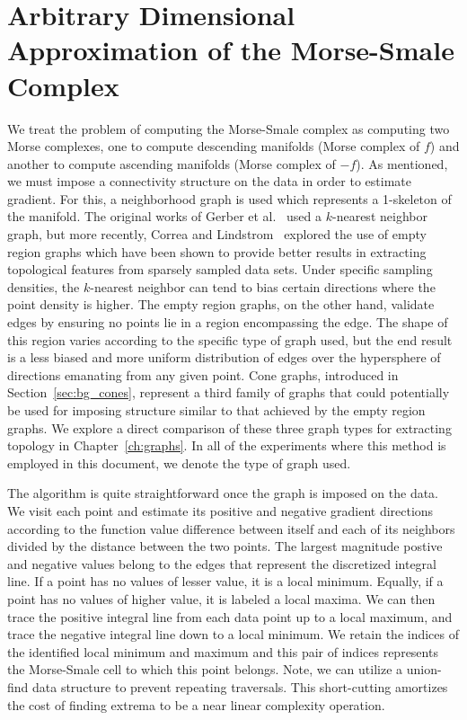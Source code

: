 \section{Arbitrary Dimensional Approximation of the Morse-Smale Complex}
\label{sec:approximationMSC}

We treat the problem of computing the Morse-Smale complex as computing two Morse complexes, one to compute descending manifolds (Morse complex of $f$) and another to compute ascending manifolds (Morse complex of $-f$).
%
As mentioned, we must impose a connectivity structure on the data in order to estimate gradient.
%
For this, a neighborhood graph is used which represents a 1-skeleton of the manifold.
%
The original works of Gerber et al.~\cite{GerberBremerPascucci2010,GerberPotter2012,GerberRubelBremer2011} used a $k$-nearest neighbor graph, but more recently, Correa and Lindstrom~\cite{CorreaLindstrom2011} explored the use of empty region graphs which have been shown to provide better results in extracting topological features from sparsely sampled data sets.
%
Under specific sampling densities, the $k$-nearest neighbor can tend to bias certain directions where the point density is higher.
%
The empty region graphs, on the other hand, validate edges by ensuring no points lie in a region encompassing the edge.
%
The shape of this region varies according to the specific type of graph used, but the end result is a less biased and more uniform distribution of edges over the hypersphere of directions emanating from any given point.
%
Cone graphs, introduced in Section~\ref{sec:bg_cones}, represent a third family of graphs that could potentially be used for imposing structure similar to that achieved by the empty region graphs.
%
We explore a direct comparison of these three graph types for extracting topology in Chapter~\ref{ch:graphs}.
%
In all of the experiments where this method is employed in this document, we denote the type of graph used.

The algorithm is quite straightforward once the graph is imposed on the data.
%
We visit each point and estimate its positive and negative gradient directions according to the function value difference between itself and each of its neighbors divided by the distance between the two points.
%
The largest magnitude postive and negative values belong to the edges that represent the discretized integral line.
%
If a point has no values of lesser value, it is a local minimum.
%
Equally, if a point has no values of higher value, it is labeled a local maxima.
%
We can then trace the positive integral line from each data point up to a local maximum, and trace the negative integral line down to a local minimum.
%
We retain the indices of the identified local minimum and maximum and this pair of indices represents the Morse-Smale cell to which this point belongs.
%
Note, we can utilize a union-find data structure to prevent repeating traversals.
%
This short-cutting amortizes the cost of finding extrema to be a near linear complexity operation.

